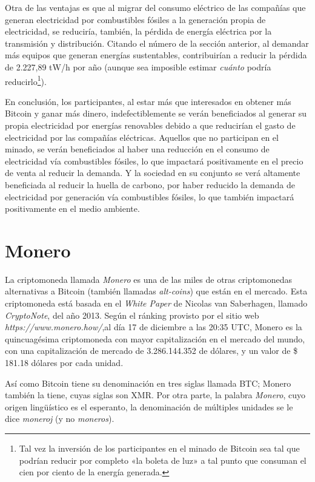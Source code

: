 \documentclass[12pt,a4paper,twoside]{book}
\begin{document}
Otra de las ventajas es que al migrar del consumo eléctrico de las compañías que generan electricidad por combustibles fósiles a la generación propia de electricidad, se reduciría, también, la pérdida de energía eléctrica por la transmisión y distribución. Citando el número de la sección anterior, al demandar más equipos que generan energías sustentables, contribuirían a reducir la pérdida de 2.227,89 tW/h por año (aunque sea imposible estimar \textit{cuánto} podría reducirlo\footnote{Tal vez la inversión de los participantes en el minado de Bitcoin sea tal que podrían reducir por completo «la boleta de luz» a tal punto que consuman el cien por ciento de la energía generada.}).

En conclusión, los participantes, al estar más que interesados en obtener más Bitcoin y ganar más dinero, indefectiblemente se verán beneficiados al generar su propia electricidad por energías renovables debido a que reducirían el gasto de electricidad por las compañías eléctricas. Aquellos que no participan en el minado, se verán beneficiados al haber una reducción en el consumo de electricidad vía combustibles fósiles, lo que impactará positivamente en el precio de venta al reducir la demanda. Y la sociedad en su conjunto se verá altamente beneficiada al reducir la huella de carbono, por haber reducido la demanda de electricidad por generación vía combustibles fósiles, lo que también impactará positivamente en el medio ambiente.

\chapter{Monero}
La criptomoneda llamada \textit{Monero} es una de las miles de otras criptomonedas alternativas a Bitcoin (también llamadas \textit{alt-coins}) que están en el mercado. Esta criptomoneda está basada en el \textit{White Paper} de Nicolas van Saberhagen, llamado \textit{CryptoNote}, del año 2013. Según el ránking provisto por el sitio web \textit{https://www.monero.how/},al día 17 de diciembre a las 20:35 UTC, Monero es la quincuagésima criptomoneda con mayor capitalización en el mercado del mundo, con una capitalización de mercado de 3.286.144.352 de dólares, y un valor de \$ 181.18 dólares por cada unidad.

Así como Bitcoin tiene su denominación en tres siglas llamada BTC; Monero también la tiene, cuyas siglas son XMR. Por otra parte, la palabra \textit{Monero}, cuyo origen lingüístico es el esperanto, la denominación de múltiples unidades se le dice \textit{moneroj} (y no \textit{moneros}).
\end{document}
